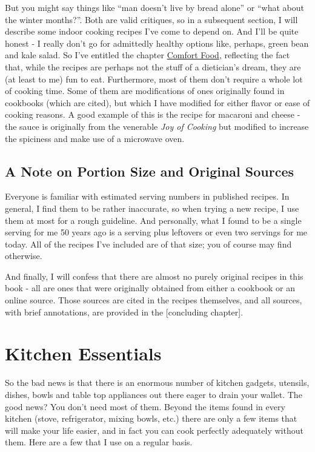\documentclass[
]{book}
\begin{document}
But you might say things like ``man doesn't live by bread alone'' or ``what about the winter months?''. Both are valid critiques, so in a subsequent section, I will describe some indoor cooking recipes I've come to depend on. And I'll be quite honest - I really don't go for admittedly healthy options like, perhaps, green bean and kale salad. So I've entitled the chapter \protect\hyperlink{comfort}{Comfort Food}, reflecting the fact that, while the recipes are perhaps not the stuff of a dietician's dream, they are (at least to me) fun to eat. Furthermore, most of them don't require a whole lot of cooking time. Some of them are modifications of ones originally found in cookbooks (which are cited), but which I have modified for either flavor or ease of cooking reasons. A good example of this is the recipe for macaroni and cheese - the sauce is originally from the venerable \emph{Joy of Cooking} but modified to increase the spiciness and make use of a microwave oven.

\hypertarget{a-note-on-portion-size-and-original-sources}{%
\section{A Note on Portion Size and Original Sources}\label{a-note-on-portion-size-and-original-sources}}

Everyone is familiar with estimated serving numbers in published recipes. In general, I find them to be rather inaccurate, so when trying a new recipe, I use them at most for a rough guideline. And personally, what I found to be a single serving for me 50 years ago is a serving plus leftovers or even two servings for me today. All of the recipes I've included are of that size; you of course may find otherwise.

And finally, I will confess that there are almost no purely original recipes in this book - all are ones that were originally obtained from either a cookbook or an online source. Those sources are cited in the recipes themselves, and all sources, with brief annotations, are provided in the {[}concluding chapter{]}.

\hypertarget{essentials}{%
\chapter{Kitchen Essentials}\label{essentials}}

So the bad news is that there is an enormous number of kitchen gadgets, utensils, dishes, bowls and table top appliances out there eager to drain your wallet. The good news? You don't need most of them. Beyond the items found in every kitchen (stove, refrigerator, mixing bowls, etc.) there are only a few items that will make your life easier, and in fact you can cook perfectly adequately without them. Here are a few that I use on a regular basis.
\end{document}
